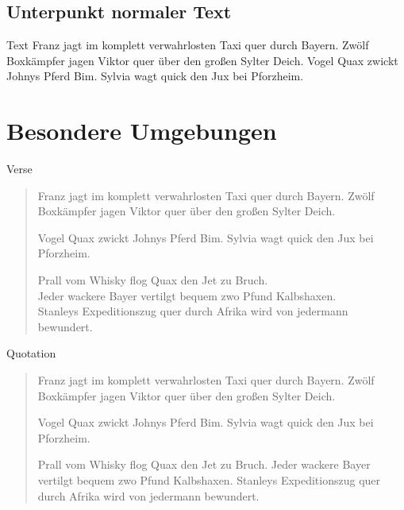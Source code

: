 	\subsection{Unterpunkt normaler Text}

	\begin{frame}{Text}
		Franz jagt im komplett verwahrlosten Taxi quer durch Bayern.
		Zwölf Boxkämpfer jagen Viktor quer über den großen Sylter Deich.
		Vogel Quax zwickt Johnys Pferd Bim.
		Sylvia wagt quick den Jux bei Pforzheim.
	\end{frame}

	\section{Besondere Umgebungen}

	\begin{frame}{Verse}
		\begin{verse}
			Franz jagt im komplett verwahrlosten Taxi quer durch Bayern.
			Zwölf Boxkämpfer jagen Viktor quer über den großen Sylter Deich.

			Vogel Quax zwickt Johnys Pferd Bim.
			Sylvia wagt quick den Jux bei Pforzheim.

			Prall vom Whisky flog Quax den Jet zu Bruch.\\
			Jeder wackere Bayer vertilgt bequem zwo Pfund Kalbshaxen.\\
			Stanleys Expeditionszug quer durch Afrika wird von jedermann bewundert.\\
		\end{verse}
	\end{frame}


	\begin{frame}{Quotation}
		\begin{quotation}
			Franz jagt im komplett verwahrlosten Taxi quer durch Bayern.
			Zwölf Boxkämpfer jagen Viktor quer über den großen Sylter Deich.

			Vogel Quax zwickt Johnys Pferd Bim.
			Sylvia wagt quick den Jux bei Pforzheim.

			Prall vom Whisky flog Quax den Jet zu Bruch.
			Jeder wackere Bayer vertilgt bequem zwo Pfund Kalbshaxen.
			Stanleys Expeditionszug quer durch Afrika wird von jedermann bewundert.
		\end{quotation}
	\end{frame}


